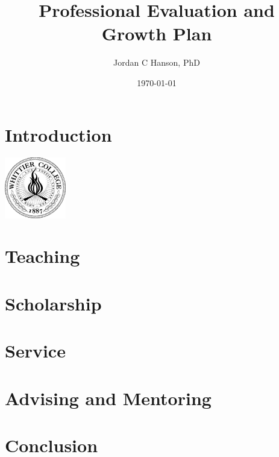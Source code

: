 \documentclass[10pt]{book}
\title{Professional Evaluation and Growth Plan}
\author{Jordan C Hanson, PhD}
\date{\today}
\begin{document}
\maketitle
\tableofcontents

\chapter{Introduction}
\centering
\includegraphics[width=0.2\textwidth]{figures/WhittierCollegeSeal.png}
\begin{flushleft}

\end{flushleft}

\chapter{Teaching}
\begin{flushleft}

\end{flushleft}

\chapter{Scholarship}
\begin{flushleft}

\end{flushleft}

\chapter{Service}
\begin{flushleft}

\end{flushleft}

\chapter{Advising and Mentoring}
\begin{flushleft}

\end{flushleft}

\chapter{Conclusion}
\begin{flushleft}

\end{flushleft}



 
\end{document}
